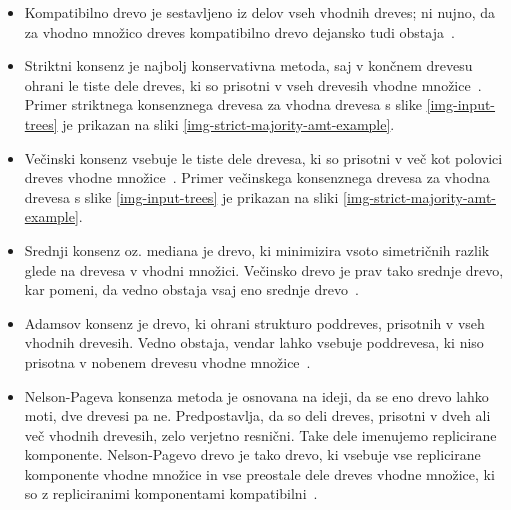 \documentclass[a4paper, 12pt]{book}
\begin{document}
\begin{itemize}
	\item Kompatibilno drevo je sestavljeno iz delov vseh vhodnih dreves; ni 
		  nujno, da za vhodno množico dreves kompatibilno drevo dejansko tudi 
		  obstaja~\cite{pw}.
	
	\item Striktni konsenz je najbolj konservativna metoda, saj v končnem 
		  drevesu ohrani le tiste dele dreves, ki so prisotni v vseh drevesih 
		  vhodne množice~\cite{bw}. Primer striktnega konsenznega drevesa za 
		  vhodna drevesa s slike \ref{img-input-trees} je prikazan na sliki 
		  \ref{img-strict-majority-amt-example}.
	
	\item Večinski konsenz vsebuje le tiste dele drevesa, ki so prisotni v več
		  kot polovici dreves vhodne množice~\cite{bw}. Primer večinskega 
		  konsenznega drevesa za vhodna drevesa s slike \ref{img-input-trees} 
		  je prikazan na sliki \ref{img-strict-majority-amt-example}.
	
	\item Srednji konsenz oz. mediana je drevo, ki minimizira vsoto simetričnih 
	      razlik glede na drevesa v vhodni množici. Večinsko drevo je prav tako 
	      srednje drevo, kar pomeni, da vedno obstaja vsaj eno srednje drevo~\cite{pw}.
	
	\item Adamsov konsenz je drevo, ki ohrani strukturo poddreves, prisotnih v vseh 
	      vhodnih drevesih. Vedno obstaja, vendar lahko vsebuje poddrevesa, ki niso 
	      prisotna v nobenem drevesu vhodne množice~\cite{classification}.
	      
	\item Nelson-Pageva konsenza metoda je osnovana na ideji, da se eno drevo 
		  lahko moti, dve drevesi pa ne. Predpostavlja, da so deli dreves, prisotni
		  v dveh ali več vhodnih drevesih, zelo verjetno resnični. Take dele imenujemo 
		  replicirane komponente. Nelson-Pagevo drevo je tako drevo, ki vsebuje vse 
		  replicirane komponente vhodne množice in vse preostale dele dreves vhodne
		  množice, ki so z repliciranimi komponentami kompatibilni~\cite{classification}.  
\end{itemize}
\end{document}
